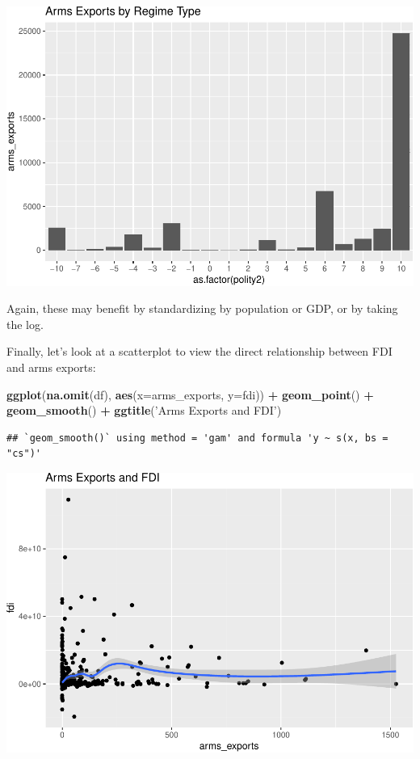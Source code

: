 \documentclass[12pt,]{article}
\newenvironment{Shaded}{\begin{snugshade}}{\end{snugshade}}
\newcommand{\DataTypeTok}[1]{\textcolor[rgb]{0.13,0.29,0.53}{#1}}
\newcommand{\KeywordTok}[1]{\textcolor[rgb]{0.13,0.29,0.53}{\textbf{#1}}}
\newcommand{\NormalTok}[1]{#1}
\newcommand{\OperatorTok}[1]{\textcolor[rgb]{0.81,0.36,0.00}{\textbf{#1}}}
\newcommand{\StringTok}[1]{\textcolor[rgb]{0.31,0.60,0.02}{#1}}
\begin{document}
\includegraphics{proposal_files/figure-latex/unnamed-chunk-20-1.pdf}

Again, these may benefit by standardizing by population or GDP, or by
taking the log.

Finally, let's look at a scatterplot to view the direct relationship
between FDI and arms exports:

\begin{Shaded}
\begin{Highlighting}[]
\KeywordTok{ggplot}\NormalTok{(}\KeywordTok{na.omit}\NormalTok{(df), }\KeywordTok{aes}\NormalTok{(}\DataTypeTok{x=}\NormalTok{arms_exports, }\DataTypeTok{y=}\NormalTok{fdi)) }\OperatorTok{+}\StringTok{ }
\StringTok{    }\KeywordTok{geom_point}\NormalTok{() }\OperatorTok{+}
\StringTok{    }\KeywordTok{geom_smooth}\NormalTok{() }\OperatorTok{+}
\StringTok{    }\KeywordTok{ggtitle}\NormalTok{(}\StringTok{'Arms Exports and FDI'}\NormalTok{)}
\end{Highlighting}
\end{Shaded}

\begin{verbatim}
## `geom_smooth()` using method = 'gam' and formula 'y ~ s(x, bs = "cs")'
\end{verbatim}

\includegraphics{proposal_files/figure-latex/unnamed-chunk-21-1.pdf}
\end{document}
